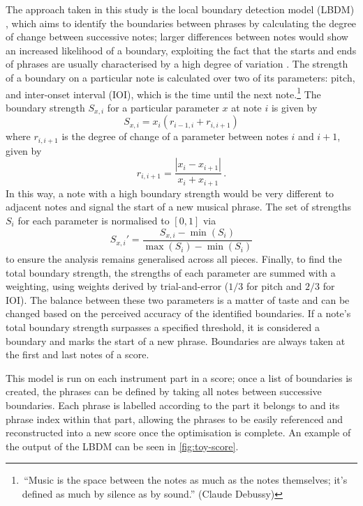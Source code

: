 \documentclass[twocolumn]{article}
\theoremstyle{definition}
\begin{document}
The approach taken in this study is the local boundary detection model (LBDM) \cite{cambouropoulos_lbdm_2011}, which aims to identify the boundaries between phrases by calculating the degree of change between successive notes; larger differences between notes would show an increased likelihood of a boundary, exploiting the fact that the starts and ends of phrases are usually characterised by a high degree of variation \cite{cambouropoulos_lbdm_2011}. The strength of a boundary on a particular note is calculated over two of its parameters: pitch, and inter-onset interval (IOI), which is the time until the next note.\footnote{\,``Music is the space between the notes as much as the notes themselves; it's defined as much by silence as by sound.'' (Claude Debussy)} The boundary strength $S_{x,i}$ for a particular parameter $x$ at note $i$ is given by
\begin{equation}
    S_{x,i}=x_i(r_{i-1, i} + r_{i, i+1})
    \label{eq:boundary-strength}
\end{equation}
where $r_{i, i+1}$ is the degree of change of a parameter between notes $i$ and $i+1$, given by
\begin{equation}
    r_{i, i+1}=\frac{|x_{i}-x_{i+1}|}{x_{i}+x_{i+1}} \,.
    \label{eq:degree-change}
\end{equation}
In this way, a note with a high boundary strength would be very different to adjacent notes and signal the start of a new musical phrase. The set of strengths $S_i$ for each parameter is normalised to $[0,1]$ via
\begin{equation}
    S_{x,i}'=\frac{S_{x,i}-\min(S_i)}{\max(S_i)-\min(S_i)}
    \label{eq:normalisation}
\end{equation}
to ensure the analysis remains generalised across all pieces.
Finally, to find the total boundary strength, the strengths of each parameter are summed with a weighting, using weights derived by trial-and-error ($1/3$ for pitch and $2/3$ for IOI). The balance between these two parameters is a matter of taste and can be changed based on the perceived accuracy of the identified boundaries. If a note's total boundary strength surpasses a specified threshold, it is considered a boundary and marks the start of a new phrase. Boundaries are always taken at the first and last notes of a score.

This model is run on each instrument part in a score; once a list of boundaries is created, the phrases can be defined by taking all notes between successive boundaries. Each phrase is labelled according to the part it belongs to and its phrase index within that part, allowing the phrases to be easily referenced and reconstructed into a new score once the optimisation is complete. An example of the output of the LBDM can be seen in \cref{fig:toy-score}.
\end{document}
